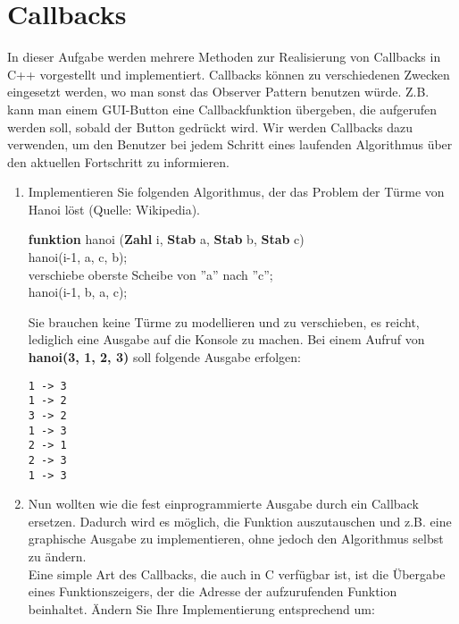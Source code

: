 \documentclass[
  accentcolor=tud1c,	%
  colorbacktitle,		%
  inverttitle,			%
  german,				%
  twoside
]{tudexercise}
\begin{document}
\section{Callbacks}
In dieser Aufgabe werden mehrere Methoden zur Realisierung von  Callbacks in C++ vorgestellt und implementiert. Callbacks können zu verschiedenen Zwecken eingesetzt werden, wo man sonst das Observer Pattern benutzen würde. Z.B. kann man einem GUI-Button eine Callbackfunktion übergeben, die aufgerufen werden soll, sobald der Button gedrückt wird. Wir werden Callbacks dazu verwenden, um den Benutzer bei jedem Schritt eines laufenden Algorithmus über den aktuellen Fortschritt zu informieren.

\begin{enumerate}

\item Implementieren Sie folgenden Algorithmus, der das Problem der Türme von Hanoi löst (Quelle: Wikipedia). \\
\begin{algorithm}[H]
 \SetAlgoLined
 \textbf{funktion} hanoi (\textbf{Zahl} i, \textbf{Stab} a, \textbf{Stab} b, \textbf{Stab} c) { \\
      {
        hanoi(i-1, a, c, b);\\
        verschiebe oberste Scheibe von ''a'' nach ''c''; \\
        hanoi(i-1, b, a, c); \\
     }
 }
\end{algorithm}

Sie brauchen keine Türme zu modellieren und zu verschieben, es reicht, lediglich eine Ausgabe auf die Konsole zu machen. Bei einem Aufruf von \textbf{hanoi(3, 1, 2, 3)} soll folgende Ausgabe erfolgen:
\begin{lstlisting}
1 -> 3
1 -> 2
3 -> 2
1 -> 3
2 -> 1
2 -> 3
1 -> 3
\end{lstlisting}

\item
Nun wollten wie die fest einprogrammierte Ausgabe durch ein Callback ersetzen. Dadurch wird es möglich, die Funktion auszutauschen und z.B. eine graphische Ausgabe zu implementieren, ohne jedoch den Algorithmus selbst zu ändern. \\

Eine simple Art des Callbacks, die auch in C verfügbar ist, ist die Übergabe eines Funktionszeigers, der die Adresse der aufzurufenden Funktion beinhaltet. Ändern Sie Ihre Implementierung entsprechend um:


\end{enumerate}
\end{document}
